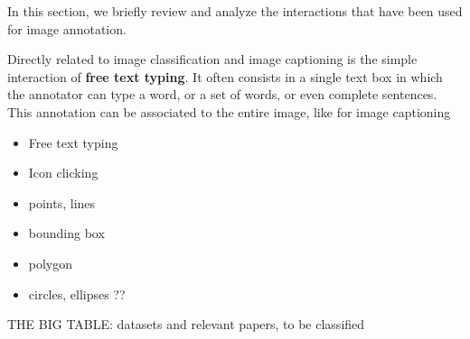 In this section, we briefly review and analyze the interactions that have been used for image annotation. 

Directly related to image classification and image captioning is the simple interaction of \textbf{free text typing}. It often consists in a single text box in which the annotator can type a word, or a set of words, or even complete sentences. This annotation can be associated to the entire image, like for image captioning 

\begin{itemize}
	\item Free text typing
	\item Icon clicking
	\item points, lines
	\item bounding box
	\item polygon
	\item circles, ellipses ??
\end{itemize}


THE BIG TABLE: datasets and relevant papers, to be classified


